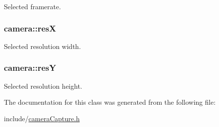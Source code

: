 Selected framerate. 

\hypertarget{structcamera_a97ec97e570c8ce140f92213f44716f18}{
\subsubsection[{res\-X}]{\setlength{\rightskip}{0pt plus 5cm}camera\-::res\-X}}\label{structcamera_a97ec97e570c8ce140f92213f44716f18}


Selected resolution width. 

\hypertarget{structcamera_a8b1040ede762f917f101589f4bcf06d3}{
\subsubsection[{res\-Y}]{\setlength{\rightskip}{0pt plus 5cm}camera\-::res\-Y}}\label{structcamera_a8b1040ede762f917f101589f4bcf06d3}


Selected resolution height. 



The documentation for this class was generated from the following file\-:\begin{DoxyCompactItemize}
\item 
include/\hyperlink{cameraCapture_8h}{camera\-Capture.\-h}\end{DoxyCompactItemize}
